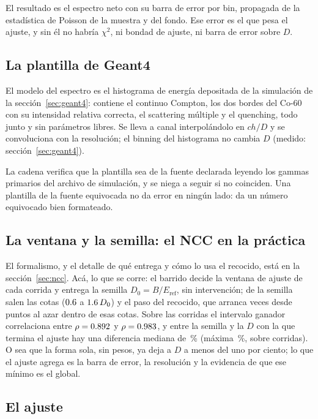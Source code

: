 \documentclass[11pt,a4paper]{article}
\begin{document}
El resultado es el espectro neto con su barra de error por bin, propagada de
la estadística de Poisson de la muestra y del fondo. Ese error es el que pesa
el ajuste, y sin él no habría $\chi^2$, ni bondad de ajuste, ni barra de error
sobre $D$.

\subsection{La plantilla de Geant4}

El modelo del espectro es el histograma de energía depositada de la
simulación de la sección~\ref{sec:geant4}: contiene el continuo Compton, los
dos bordes del Co-60 con su intensidad relativa correcta, el scattering
múltiple y el quenching, todo junto y sin parámetros libres. Se lleva a canal
interpolándolo en $ch/D$ y se convoluciona con la resolución; el binning del
histograma no cambia $D$ (medido: sección~\ref{sec:geant4}).

La cadena verifica que la plantilla sea de la fuente declarada leyendo los
gammas primarios del archivo de simulación, y se niega a seguir si no
coinciden. Una plantilla de la fuente equivocada no da error en ningún lado:
da un número equivocado bien formateado.

\subsection{La ventana y la semilla: el NCC en la práctica}

El formalismo, y el detalle de qué entrega y cómo lo usa el recocido, está en
la sección~\ref{sec:ncc}. Acá, lo que se corre: el barrido decide la ventana
de ajuste de cada corrida y entrega la semilla $D_0 = B/E_{\text{ref}}$, sin
intervención; de la semilla salen las cotas ($0.6$ a $1.6\,D_0$) y
el paso del recocido, que arranca \NArranques{} veces desde puntos al azar
dentro de esas cotas. Sobre las \NCorridas{} corridas el intervalo ganador
correlaciona entre $\rho = 0.892$ y $\rho = 0.983$, y entre la semilla y la
$D$ con la que termina el ajuste hay una diferencia mediana de
\SemillaMediana\,\% (máxima \SemillaMax\,\%, sobre \NSemillas{} corridas). O
sea que la forma sola, sin pesos, ya deja a $D$ a menos del uno por ciento; lo
que el ajuste agrega es la barra de error, la resolución y la evidencia de que
ese mínimo es el global.


\subsection{El ajuste}
\label{sec:ajuste}
\end{document}
